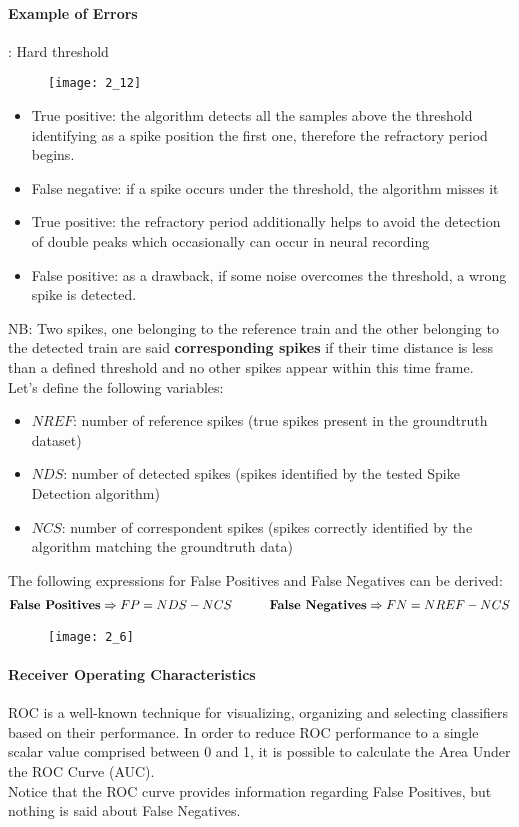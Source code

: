 \paragraph{Example of Errors}: Hard threshold\\
\begin{figure}[H]
    \centering
    \texttt{[image: 2\_12]}
\end{figure}
\begin{itemize}
    \item True positive: the algorithm detects all the samples above the threshold identifying as a spike position the first one, therefore the refractory period begins.
    \item False negative: if a spike occurs under the threshold, the algorithm misses it
    \item True positive: the refractory period additionally helps to avoid the detection of double peaks which occasionally can occur in neural recording
    \item False positive: as a drawback, if some noise overcomes the threshold, a wrong spike is detected.
\end{itemize}
NB: Two spikes, one belonging to the reference train and the other belonging to the detected train are said \textbf{corresponding spikes} if their time distance is less than a defined threshold and no other spikes appear within this time frame.\\
Let's define the following variables:
\begin{itemize}
    \item \(NREF\): number of reference spikes (true spikes present in the groundtruth dataset)
    \item \(NDS\): number of detected spikes (spikes identified by the tested Spike Detection algorithm)
    \item \(NCS\): number of correspondent spikes (spikes correctly identified by the algorithm matching the groundtruth data)
\end{itemize}
The following expressions for False Positives and False Negatives can be derived:
\begin{align*}
    \text{\textbf{False Positives}}\Rightarrow FP=NDS-NCS
    \quad\quad\quad
    \text{\textbf{False Negatives}}\Rightarrow FN=NREF-NCS
\end{align*}
\begin{figure}[H]
    \texttt{[image: 2\_6]}
    \centering
\end{figure}
\paragraph{Receiver Operating Characteristics} ROC is a well-known technique for visualizing, organizing and selecting classifiers based on their performance. In order to reduce ROC performance to a single scalar value comprised between 0 and 1, it is possible to calculate the Area Under the ROC Curve (AUC).\\
Notice that the ROC curve provides information regarding False Positives, but nothing is said about
False Negatives.
